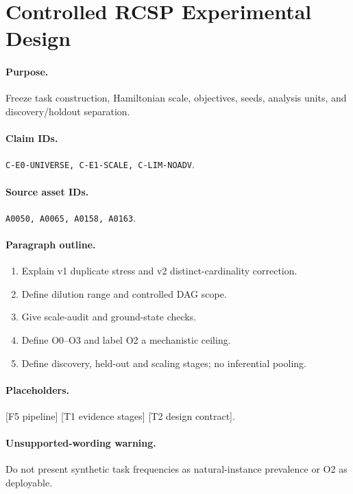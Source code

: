 \section{Controlled RCSP Experimental Design}

\paragraph{Purpose.}
Freeze task construction, Hamiltonian scale, objectives, seeds, analysis units,
and discovery/holdout separation.

\paragraph{Claim IDs.}
\texttt{C-E0-UNIVERSE, C-E1-SCALE, C-LIM-NOADV}.

\paragraph{Source asset IDs.}
\texttt{A0050, A0065, A0158, A0163}.

\paragraph{Paragraph outline.}
\begin{enumerate}
  \item Explain v1 duplicate stress and v2 distinct-cardinality correction.
  \item Define dilution range and controlled DAG scope.
  \item Give scale-audit and ground-state checks.
  \item Define O0--O3 and label O2 a mechanistic ceiling.
  \item Define discovery, held-out and scaling stages; no inferential pooling.
\end{enumerate}

\paragraph{Placeholders.}
[F5 pipeline] [T1 evidence stages] [T2 design contract].

\paragraph{Unsupported-wording warning.}
Do not present synthetic task frequencies as natural-instance prevalence or O2
as deployable.
